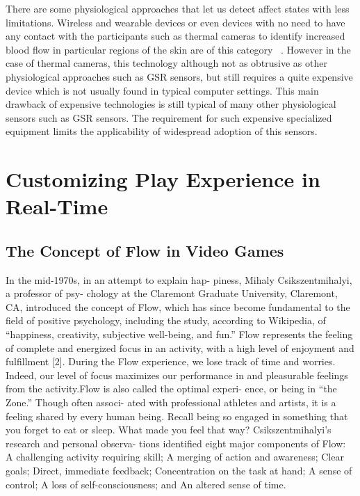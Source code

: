\documentclass{uofsthesis-cs}
\begin{document}
There are some physiological approaches that let us detect affect states with less limitations. Wireless and wearable devices or even devices with no need to have any contact with the participants such as thermal cameras to identify increased blood flow in particular regions of the skin are of this category ~\cite{puri2005stresscam}. However in the case of thermal cameras, this technology although not as obtrusive as other physiological approaches such as GSR sensors, but still requires a quite expensive device which is not usually found in typical computer settings. This main drawback of expensive technologies is still typical of many other physiological sensors such as GSR sensors. The requirement for such expensive specialized equipment limits the applicability of widespread adoption of this sensors. 


\chapter{Customizing Play Experience in Real-Time}
\label{chap:custmz}


\section{The Concept of Flow in Video Games}

In the mid-1970s, in an attempt to explain hap- piness, Mihaly Csikszentmihalyi, a professor of psy- chology at the Claremont Graduate University, Claremont, CA, introduced the concept of Flow, which has since become fundamental to the field of positive psychology, including the study, according to Wikipedia, of “happiness, creativity, subjective well-being, and fun.” Flow represents the feeling of complete and energized focus in an activity, with a high level of enjoyment and fulfillment [2]. During the Flow experience, we lose track of time and worries. Indeed, our level of focus maximizes our performance in and pleasurable feelings from the activity.Flow is also called the optimal experi- ence, or being in “the Zone.” Though often associ- ated with professional athletes and artists, it is a feeling shared by every human being. Recall being so engaged in something that you forget to eat or sleep. What made you feel that way? Csikszentmihalyi’s research and personal observa- tions identified eight major components of Flow: 
 A challenging activity requiring skill;
 A merging of action and awareness;
 Clear goals;
 Direct, immediate feedback;
 Concentration on the task at hand; 
 A sense of control;
 A loss of self-consciousness; and
 An altered sense of time. 
\end{document}
